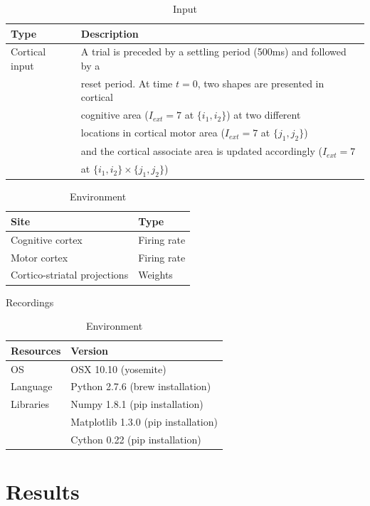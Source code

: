\begin{table}[htbp]
\small \centering
\begin{tabular}{ll}
\bf Type & \bf Description\\
\hline
Cortical input & A trial is preceded by a settling period (500ms) and
followed by a\\
& reset period. At time \(t=0\), two shapes are presented in
cortical\\
& cognitive area (\(I_{ext}=7\) at \(\{i_1,i_2\}\)) at two
different\\
& locations in cortical motor area (\(I_{ext}=7\) at
\(\{j_1,j_2\}\))\\
& and the cortical associate area is updated accordingly
(\(I_{ext}=7\)\\
& at \(\{i_1,i_2\}\times\{j_1,j_2\}\))\\
\hline
\end{tabular}
\caption{Input}
\end{table}


\begin{table}[htbp]
  \parbox{.45\linewidth}{
\small \centering
\begin{tabular}{ll}
\bf Site & \bf Type\\
\hline
Cognitive cortex             & Firing rate\\
Motor cortex                 & Firing rate\\
Cortico-striatal projections & Weights\\
\hline
\end{tabular}
\caption{Recordings}
}
\hfill
\parbox{.45\linewidth}{
\small \centering
\begin{tabular}{ll}
\bf Resources & \bf Version\\
\hline
OS        & OSX 10.10 (yosemite)\\
Language  & Python 2.7.6 (brew installation)\\
Libraries & Numpy 1.8.1 (pip installation)\\
          & Matplotlib 1.3.0 (pip installation)\\
          & Cython 0.22 (pip installation)\\
\hline
\end{tabular}
\caption{Environment}
}
\end{table}


\section*{Results}

